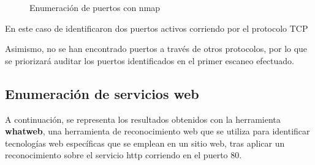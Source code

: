 \documentclass[a4paper]{article}
\begin{document}
\begin{figure}[h]
  \centering
  \setlength{\fboxrule}{0.8pt}
  \caption{Enumeración de puertos con nmap}
\end{figure}

\vspace{0.4cm}
En este caso de identificaron dos puertos activos corriendo por el protocolo TCP
\vspace{0.5cm}

\centering
{}

\vspace{0.5cm}
\justifying     %

Asimismo, no se han encontrado puertos a través de otros protocolos, por lo que se priorizará
auditar los puertos identificados en el primer escaneo efectuado.

\clearpage
\subsection{Enumeración de servicios web}

A continuación, se representa los resultados obtenidos con la herramienta \textbf{whatweb},
una herramienta de reconocimiento web que se utiliza para identificar tecnologías web
específicas que se emplean en un sitio web, tras aplicar un reconocimiento sobre el 
servicio http corriendo en el puerto 80.
\end{document}
